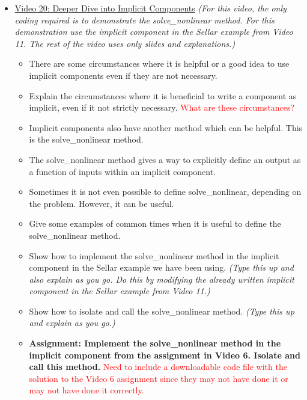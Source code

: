 \documentclass[12pt, letterpaper]{article}
\begin{document}
\begin{itemize}
	\item \underline{Video 20: Deeper Dive into Implicit Components} \textit{(For this video, the only coding required is to demonstrate the solve\_nonlinear method. For this demonstration use the implicit component in the Sellar example from Video 11. The rest of the video uses only slides and explanations.)}
		\begin{itemize}
			\item There are some circumstances where it is helpful or a good idea to use implicit components even if they are not necessary.
			\item Explain the circumstances where it is beneficial to write a component as implicit, even if it not strictly necessary. \textcolor{red}{What are these circumstances?}
			\item Implicit components also have another method which can be helpful. This is the solve\_nonlinear method.
			\item The solve\_nonlinear method gives a way to explicitly define an output as a function of inputs within an implicit component.
			\item Sometimes it is not even possible to define solve\_nonlinear, depending on the problem. However, it can be useful.
			\item Give some examples of common times when it is useful to define the solve\_nonlinear method.
			\item Show how to implement the solve\_nonlinear method in the implicit component in the Sellar example we have been using. \textit{(Type this up and also explain as you go. Do this by modifying the already written implicit component in the Sellar example from Video 11.)}
			\item Show how to isolate and call the solve\_nonlinear method. \textit{(Type this up and explain as you go.)}
			\item \textbf{Assignment: Implement the solve\_nonlinear method in the implicit component from the assignment in Video 6. Isolate and call this method.} \textcolor{red}{Need to include a downloadable code file with the solution to the Video 6 assignment since they may not have done it or may not have done it correctly.}
		\end{itemize}


\end{itemize}
\end{document}
